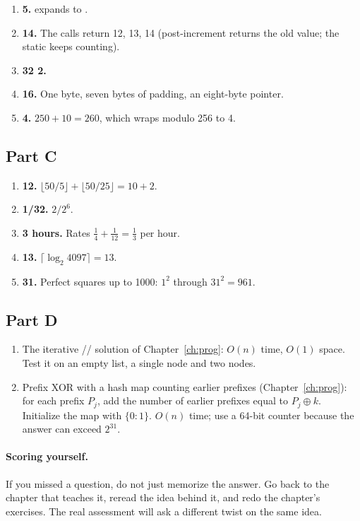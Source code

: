 \begin{enumerate}
  \item \textbf{5.}  expands to .
  \item \textbf{14.} The calls return 12, 13, 14 (post-increment returns the old value; the static keeps counting).
  \item \textbf{32 2.}
  \item \textbf{16.} One byte, seven bytes of padding, an eight-byte pointer.
  \item \textbf{4.} $250 + 10 = 260$, which wraps modulo 256 to 4.
\end{enumerate}

\subsection*{Part C}

\begin{enumerate}
  \item \textbf{12.} $\lfloor 50/5\rfloor + \lfloor 50/25\rfloor = 10 + 2$.
  \item \textbf{1/32.} $2/2^6$.
  \item \textbf{3 hours.} Rates $\tfrac14 + \tfrac1{12} = \tfrac13$ per hour.
  \item \textbf{13.} $\lceil\log_2 4097\rceil = 13$.
  \item \textbf{31.} Perfect squares up to 1000: $1^2$ through $31^2 = 961$.
\end{enumerate}

\subsection*{Part D}

\begin{enumerate}
  \item The iterative // solution of Chapter~\ref{ch:prog}: $O(n)$ time, $O(1)$ space. Test it on an empty list, a single node and two nodes.
  \item Prefix XOR with a hash map counting earlier prefixes (Chapter~\ref{ch:prog}): for each prefix $P_j$, add the number of earlier prefixes equal to $P_j \oplus k$. Initialize the map with $\{0: 1\}$. $O(n)$ time; use a 64-bit counter because the answer can exceed $2^{31}$.
\end{enumerate}

\paragraph{Scoring yourself.} If you missed a question, do not just memorize the answer. Go back to the chapter that teaches it, reread the idea behind it, and redo the chapter's exercises. The real assessment will ask a different twist on the same idea.
